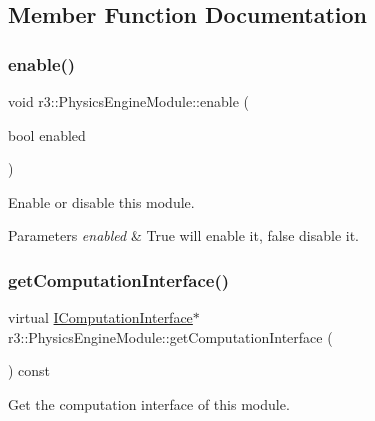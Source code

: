 \subsection{Member Function Documentation}
\mbox{\label{classr3_1_1_physics_engine_module_abaaace8d25ea23ed21ade61ca2b201d0}} 
\subsubsection{\texorpdfstring{enable()}{enable()}}
{\footnotesize\ttfamily void r3\+::\+Physics\+Engine\+Module\+::enable (\begin{DoxyParamCaption}\item[{bool}]{enabled }\end{DoxyParamCaption})}



Enable or disable this module. 


\begin{DoxyParams}{Parameters}
{\em enabled} & True will enable it, false disable it. \\
\hline
\end{DoxyParams}
\mbox{\label{classr3_1_1_physics_engine_module_a3b1d0d9bea0a82534f367f6d728312d3}} 
\subsubsection{\texorpdfstring{get\+Computation\+Interface()}{getComputationInterface()}}
{\footnotesize\ttfamily virtual \mbox{\hyperlink{classr3_1_1_i_computation_interface}{I\+Computation\+Interface}}$\ast$ r3\+::\+Physics\+Engine\+Module\+::get\+Computation\+Interface (\begin{DoxyParamCaption}{ }\end{DoxyParamCaption}) const\hspace{0.3cm}{\ttfamily [pure virtual]}}



Get the computation interface of this module. 

